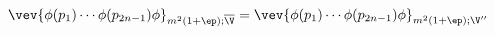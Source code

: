 \begin{equation}
\vev{ \phi (p_1) \cdots \phi (p_{2n-1}) \phi}_{m^2 (1 + \ep);
\overline{\V}} = \vev{ \phi (p_1) \cdots \phi (p_{2n-1}) \phi }_{m^2
(1 + \ep); \V''} \label{altequivalence}
\end{equation}

